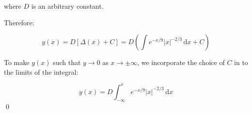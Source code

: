\documentclass[12pt]{article}
\begin{document}
where $D$ is an arbitrary constant.

Therefore:

\begin{equation}
    y(x) = D \left[ \Delta(x) + C \right] = D \left( \int e^{-x/9} \left\lvert x \right\rvert^{-2/3} \, \mathrm{d}x + C \right)
\end{equation}

To make $y(x)$ such that $y \to 0$ as $x \to \pm \infty$, we incorporate the choice of $C$ in to the limits of the integral:

\begin{equation}
    y(x) = D \int_{-\infty}^{x} e^{-x/9} \left\lvert x \right\rvert^{-2/3} \, \mathrm{d}x
\end{equation}
\qed
\end{document}
